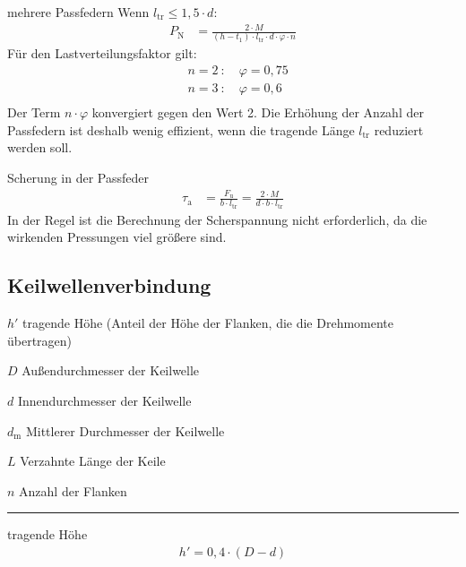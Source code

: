 \enlargethispage{\baselineskip}

\begin{eeqn}{mehrere Passfedern}
	Wenn $l_\text{tr} \leq 1,5 \cdot d$:
	\begin{align}
		P_\text{N} &= \frac{2\cdot M}{(h-t_1)\cdot l_\text{tr} \cdot d \cdot \varphi \cdot n}
	\end{align}
	Für den Lastverteilungsfaktor gilt:
	\begin{align*}
		&n =2~: \quad \varphi =0,75\\
		&n =3~: \quad \varphi =0,6\\
	\end{align*}
	Der Term $n \cdot \varphi$ konvergiert gegen den Wert 2. Die Erhöhung der Anzahl der Passfedern ist deshalb wenig effizient, wenn die tragende Länge $l_\text{tr}$ reduziert werden soll.
\end{eeqn}

\begin{eeqn}{Scherung in der Passfeder}
	\begin{align}
		\tau_\text{a} &= \frac{F_\text{u}}{b\cdot l_\text{tr}} = \frac{2\cdot M}{d\cdot b \cdot l_\text{tr}}
	\end{align}
	In der Regel ist die Berechnung der Scherspannung nicht erforderlich, da die wirkenden Pressungen viel größere sind.
\end{eeqn}

\subsection{Keilwellenverbindung}
\begin{vardef}
	\item[$h'$] tragende Höhe (Anteil der Höhe der Flanken, die die Drehmomente übertragen)
	\item[$D$] Außendurchmesser der Keilwelle
	\item[$d$] Innendurchmesser der Keilwelle
	\item[$d_\text{m}$] Mittlerer Durchmesser der Keilwelle
	\item[$L$] Verzahnte Länge der Keile
	\item[$n$] Anzahl der Flanken
\end{vardef}

\hrule
\begin{eeqn}{tragende Höhe}
	\begin{align}
		h' = 0,4 \cdot (D-d)
	\end{align}
\end{eeqn}

